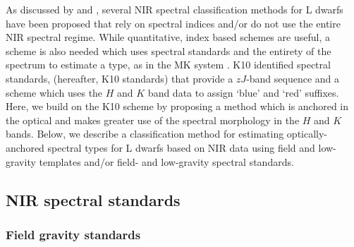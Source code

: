 \documentclass[12pt,preprint]{aastex}
\begin{document}
As discussed by \citet[\S~3.2]{Kirkpatrick05} and \citet[hereafter K10]{Kirkpatrick10}, several NIR spectral classification methods for L dwarfs have been proposed that rely on spectral indices and/or do not use the entire NIR spectral regime.
While quantitative, index based schemes are useful, a scheme is also needed which uses spectral standards and the entirety of the spectrum to estimate a type, as in the MK system \citep{Morgan:1984wy}.
K10 identified spectral standards, (hereafter, K10 standards) that provide a $zJ$-band sequence and a scheme which uses the $H$ and $K$ band data to assign `blue' and `red' suffixes. 
Here, we build on the K10 scheme by proposing a method which is anchored in the optical and makes greater use of the spectral morphology in the $H$ and $K$ bands.
Below, we describe a classification method for estimating optically-anchored spectral types for L dwarfs based on NIR data using field and low-gravity templates and/or field- and low-gravity spectral standards.



\subsection{NIR spectral standards}
\subsubsection{Field gravity standards}
\label{sec:field_stds}
\end{document}
